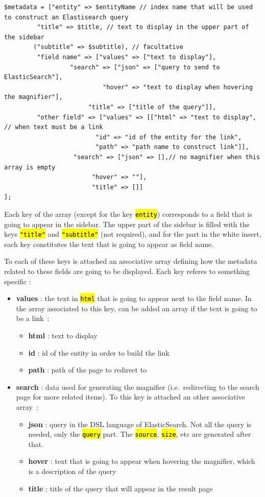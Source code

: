 \documentclass[a4paper,12pt,twoside]{book}
\let\OldTexttt\texttt
\renewcommand{\texttt}[1]{\OldTexttt{\hl{#1}}}
\begin{document}
\begin{lstlisting}
$metadata = ["entity" => $entityName // index name that will be used to construct an Elastisearch query
         "title" => $title, // text to display in the upper part of the sidebar
        ("subtitle" => $subtitle), // facultative
         "field name" => ["values" => ["text to display"],
                  "search" => ["json" => ["query to send to ElasticSearch"],
                           "hover" => "text to display when hovering the magnifier"],
                       "title" => ["title of the query"]],
         "other field" => ["values" => [["html" => "text to display", // when text must be a link
                         "id" => "id of the entity for the link",
                         "path" => "path name to construct link"]],
                   "search" => ["json" => [],// no magnifier when this array is empty
                        "hover" => ""],
                        "title" => []]
];
\end{lstlisting}

Each key of the array (except for the key \texttt{entity}) corresponds to a field that is going to appear in the sidebar. The upper part of the sidebar is filled with the keys \texttt{"title"} and \texttt{"subtitle"} (not required), and for the part in the white insert, each key constitutes the text that is going to appear as field name.

To each of these keys is attached an associative array defining how the metadata related to these fields are going to be displayed. Each key referes to something specific :
\begin{itemize}
	\item  \textbf{values} : the text in \texttt{html} that is going to appear next to the field name. In the array associated to this key, can be added an array if the text is going to be a link~:
	\begin{itemize}
		\item \textbf{html} : text to display
		\item \textbf{id} : id of the entity in order to build the link
		\item \textbf{path} : path of the page to redirect to 
	\end{itemize}
	\item \textbf{search} : data used for generating the magnifier (i.e.~redirecting to the search page for more related items). To this key is attached an other associative array~:
	\begin{itemize}
		\item \textbf{json} : query in the DSL language of ElasticSearch. Not all the query is needed, only the \texttt{query} part. The \texttt{source}, \texttt{size}, etc are generated after that.
		\item \textbf{hover} : text that is going to appear when hovering the magnifier, which is a description of the query
		\item \textbf{title} : title of the query that will appear in the result page
	\end{itemize}
\end{itemize}
\end{document}

